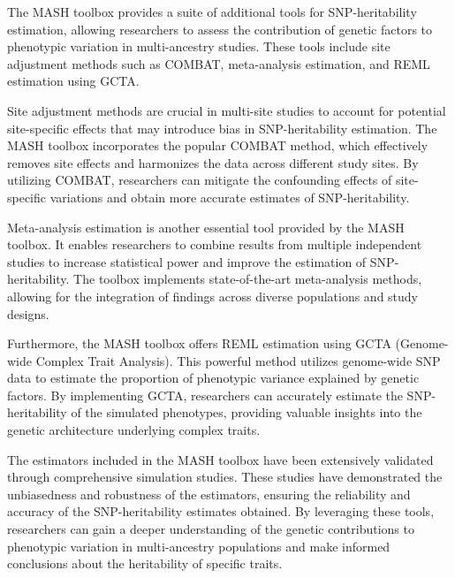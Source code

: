 \documentclass[sn-nature]{sn-jnl}%
\begin{document}

The MASH toolbox provides a suite of additional tools for SNP-heritability estimation, allowing researchers to assess the contribution of genetic factors to phenotypic variation in multi-ancestry studies. These tools include site adjustment methods such as COMBAT, meta-analysis estimation, and REML estimation using GCTA.

Site adjustment methods are crucial in multi-site studies to account for potential site-specific effects that may introduce bias in SNP-heritability estimation. The MASH toolbox incorporates the popular COMBAT method, which effectively removes site effects and harmonizes the data across different study sites. By utilizing COMBAT, researchers can mitigate the confounding effects of site-specific variations and obtain more accurate estimates of SNP-heritability.

Meta-analysis estimation is another essential tool provided by the MASH toolbox. It enables researchers to combine results from multiple independent studies to increase statistical power and improve the estimation of SNP-heritability. The toolbox implements state-of-the-art meta-analysis methods, allowing for the integration of findings across diverse populations and study designs.

Furthermore, the MASH toolbox offers REML estimation using GCTA (Genome-wide Complex Trait Analysis). This powerful method utilizes genome-wide SNP data to estimate the proportion of phenotypic variance explained by genetic factors. By implementing GCTA, researchers can accurately estimate the SNP-heritability of the simulated phenotypes, providing valuable insights into the genetic architecture underlying complex traits.

The estimators included in the MASH toolbox have been extensively validated through comprehensive simulation studies. These studies have demonstrated the unbiasedness and robustness of the estimators, ensuring the reliability and accuracy of the SNP-heritability estimates obtained. By leveraging these tools, researchers can gain a deeper understanding of the genetic contributions to phenotypic variation in multi-ancestry populations and make informed conclusions about the heritability of specific traits.
\end{document}

